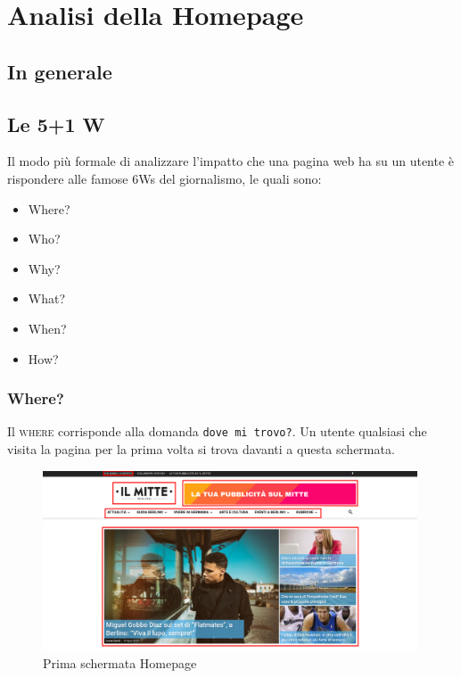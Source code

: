 \newpage
\section{Analisi della Homepage}
\subsection{In generale}


\subsection{Le 5+1 W}
Il modo più formale di analizzare l'impatto che una pagina web ha su un utente è rispondere alle famose 6Ws del giornalismo, le quali sono:
\begin{itemize}
\item Where?
\item Who?
\item Why?
\item What?
\item When?
\item How?
\end{itemize}

\subsubsection{Where?}
Il \textsc{where} corrisponde alla domanda \texttt{dove mi trovo?}. Un utente qualsiasi che visita la pagina per la prima volta si trova davanti a questa schermata.

\vspace{30pt}
\begin{figure}[htbp]
\begin{center}
\includegraphics[width=30em]{img/home1}
\caption{Prima schermata Homepage}
\end{center}
\end{figure}
\vspace{30pt}

